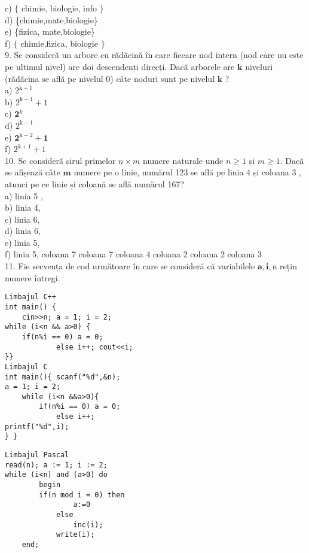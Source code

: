 c) $\{$ chimie, biologie, info $\}$\\
d) \{chimie,mate,biologie\}\\
e) \{fizica, mate,biologie\}\\
f) $\{$ chimie,fizica, biologie $\}$\\
9. Se consideră un arbore cu rădăcină în care fiecare nod intern (nod care nu este pe ultimul nivel) are doi descendenți direcți. Dacă arborele are $\mathbf{k}$ niveluri (rădăcina se află pe nivelul 0) câte noduri sunt pe nivelul $\mathbf{k}$ ?\\
a) $2^{\mathrm{k}+1}$\\
b) $2^{\mathrm{k}-1}+1$\\
c) $\mathbf{2}^{k}$\\
d) $2^{\mathrm{k}-1}$\\
e) $\mathbf{2}^{\mathrm{k}-2}+\mathbf{1}$\\
f) $2^{k+1}+1$\\
10. Se consideră șirul primelor $n \times m$ numere naturale unde $n \geq 1$ și $m \geq 1$. Dacă se afișează câte $\mathbf{m}$ numere pe o linie, numărul 123 se află pe linia 4 și coloana 3 , atunci pe ce linie și coloană se află numărul 167?\\
a) linia 5 ,\\
b) linia 4,\\
c) linia 6,\\
d) linia 6,\\
e) linia 5,\\
f) linia 5, coloana 7 coloana 7 coloana 4 coloana 2 coloana 2 coloana 3\\
11. Fie secvența de cod următoare în care se consideră că variabilele $\mathbf{a}, \mathbf{i}, \mathrm{n}$ rețin numere întregi.

\begin{verbatim}
Limbajul C++
int main() {
    cin>>n; a = 1; i = 2;
while (i<n && a>0) {
    if(n%i == 0) a = 0;
            else i++; cout<<i;
}}
Limbajul C
int main(){ scanf("%d",&n);
a = 1; i = 2;
    while (i<n &&a>0){
        if(n%i == 0) a = 0;
            else i++;
printf("%d",i);
} }
\end{verbatim}

\begin{verbatim}
Limbajul Pascal
read(n); a := 1; i := 2;
while (i<n) and (a>0) do
        begin
        if(n mod i = 0) then
                a:=0
            else
                inc(i);
            write(i);
    end;
\end{verbatim}

